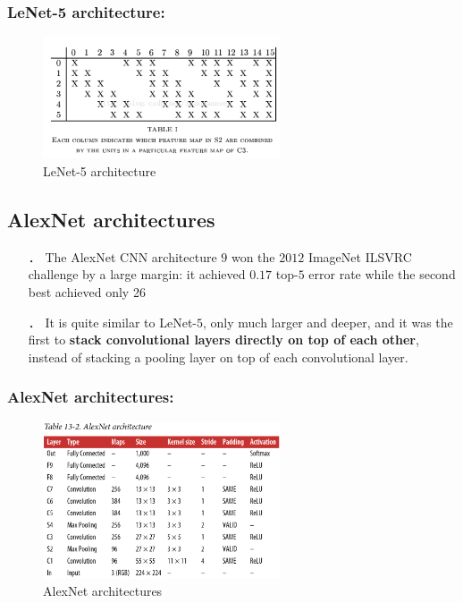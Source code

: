 \documentclass{beamer}
\begin{document}
    \begin{frame}
    \frametitle{LeNet-5 architecture: }
        \begin{figure}[H]
            \begin{center}
                \includegraphics[width=7cm]{table13-4}
            \end{center}
        \caption{LeNet-5 architecture}
        \end{figure}
    \end{frame}
\subsection{AlexNet architectures}
    \begin{frame}
        \begin{itemize}
            \item[．] The AlexNet CNN architecture $9$ won the $2012$ ImageNet ILSVRC challenge by a large margin: it achieved $0.17$ top-$5$ error rate while the second best achieved only 26%
            \item[．] It is quite similar to LeNet-$5$, only much larger and deeper, and it was the first to \textbf{stack convolutional layers directly on top of each other}, instead of stacking a pooling layer on top of each convolutional layer.
        \end{itemize}
    \end{frame}
    \begin{frame}
    \frametitle{AlexNet architectures: }
        \begin{figure}[H]
            \begin{center}
                \includegraphics[width=7cm]{table13-2}
            \end{center}
        \caption{AlexNet architectures}
        \end{figure}
    \end{frame}
\end{document}
